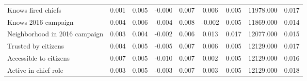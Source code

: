 {\begin{tabular}{l*{8}{c}}
Knows fired chiefs & 0.001 & 0.005 & -0.000 & 0.007 & 0.006 & 0.005 & 11978.000 & 0.017 \\
Knows 2016 campaign & 0.004 & 0.006 & -0.004 & 0.008 & -0.002 & 0.005 & 11869.000 & 0.014 \\
Neighborhood in 2016 campaign & 0.003 & 0.004 & -0.002 & 0.006 & 0.013 & 0.017 & 12077.000 & 0.015 \\
Trusted by citizens & 0.004 & 0.005 & -0.005 & 0.007 & 0.006 & 0.005 & 12129.000 & 0.017 \\
Accessible to citizens & 0.007 & 0.005 & -0.010 & 0.007 & 0.002 & 0.005 & 12129.000 & 0.016 \\
Active in chief role & 0.003 & 0.005 & -0.003 & 0.007 & 0.003 & 0.005 & 12129.000 & 0.018 \\
\hline\hline \end{tabular} }
